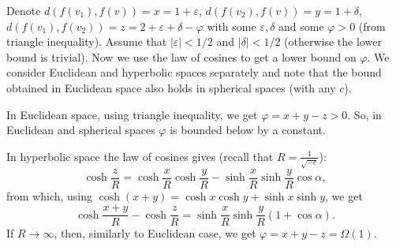 \documentclass{article} %
\begin{document}
Denote $d(f(v_1),f(v)) = x = 1 + \varepsilon$, $d(f(v_2),f(v)) = y = 1 + \delta$, $d(f(v_1),f(v_2)) = z = 2 + \varepsilon + \delta - \varphi$ with some $\varepsilon, \delta$ and some $\varphi > 0$ (from triangle inequality). Assume that $|\varepsilon| < 1/2$ and $|\delta| < 1/2$ (otherwise the lower bound is trivial). Now we use the law of cosines to get a lower bound on $\varphi$.
We consider Euclidean and hyperbolic spaces separately and note that the bound obtained in Euclidean space also holds in spherical spaces (with any $c$).

In Euclidean space, using triangle inequality, we get  $\varphi = x + y - z > 0$. So, in Euclidean and spherical spaces $\varphi$ is bounded below by a constant.

In hyperbolic space the law of cosines gives 
(recall that $R = \frac{1}{\sqrt{-c}}$):
\[
\cosh \frac{z}{R} = \cosh \frac{x}{R} \cosh \frac{y}{R} - \sinh \frac{x}{R} \sinh \frac{y}{R} \cos \alpha,
\]
from which, using $\cosh(x+y) =\cosh x\cosh y+\sinh x\sinh y$, we get 
\[
\cosh \frac{x+y}{R} - \cosh \frac{z}{R} = \sinh \frac{x}{R} \sinh \frac{y}{R} (1 + \cos \alpha). %
\]
If $R \to \infty$, then, similarly to Euclidean case, we get $\varphi = x + y - z = \Omega(1)$. 

\end{document}

